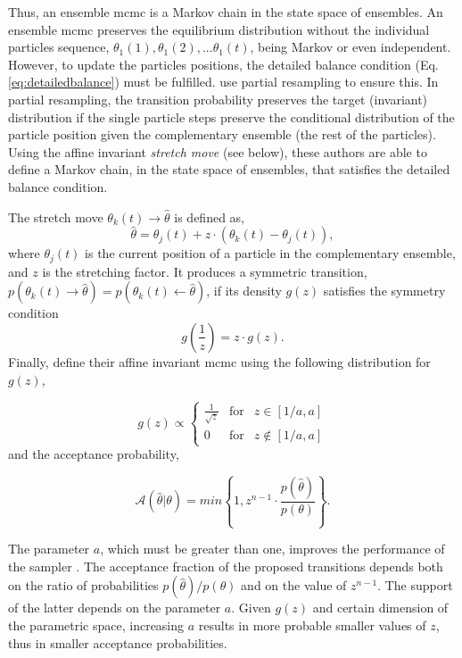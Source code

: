 Thus, an ensemble \gls{mcmc} is a Markov chain in the state space of ensembles. An ensemble \gls{mcmc} preserves the equilibrium distribution without the individual particles sequence, $\theta_1(1),\theta_1(2),...\theta_1(t)$, being Markov or even independent. However, to update the particles positions, the detailed balance condition (Eq. \ref{eq:detailedbalance}) must be fulfilled. \citet{Goodman2010} use partial resampling to ensure this. In partial resampling, the transition probability preserves the target (invariant) distribution if the single particle steps preserve the conditional distribution of the particle position given the complementary ensemble (the rest of the particles). Using the affine invariant \emph{stretch move} (see below), these authors are able to define a Markov chain, in the state space of ensembles, that satisfies the detailed balance condition. 

The stretch move $\theta_k(t) \rightarrow \hat{\theta}$ is defined as,
\begin{equation}
\label{eq:stretchmove}
\hat{\theta}= \theta_j(t) + z\cdot(\theta_k(t)-\theta_j(t)),\nonumber 
\end{equation}
where $\theta_j(t)$ is the current position of a particle in the complementary ensemble, and $z$ is the stretching factor. It produces a symmetric transition, $p(\theta_k(t) \rightarrow \hat{\theta})=p(\theta_k(t) \leftarrow \hat{\theta})$, if its density $g(z)$ satisfies the symmetry condition
\begin{equation}
g(\frac{1}{z})= z\cdot g(z).\nonumber 
\end{equation}
Finally, \citet{Goodman2010} define their affine invariant \gls{mcmc} using the following distribution for $g(z)$,

\begin{equation}
g(z) \propto \left\{ \begin{array}{rcl}
         \frac{1}{\sqrt{z}} & \mbox{for}&  z\in[1/a,a] \\ 
         0  & \mbox{for} &  z\notin[1/a,a]
                \end{array}\right.
\label{eq:gz}
\end{equation} 
and the acceptance probability,

\begin{equation}
\mathcal{A}(\hat{\theta}|\theta)=min\left\{1,z^{n-1}\cdot \frac{p(\hat{\theta})}{p(\theta)}\right\}.
\end{equation} 

{The parameter $a$, which must be greater than one, improves the performance of the sampler \citep{Goodman2010}. The acceptance fraction of the proposed transitions depends both on the ratio of probabilities $p(\hat{\theta})/p(\theta)$ and on the value of $z^{n-1}$. The support of the latter depends on the parameter $a$. Given $g(z)$ and certain dimension of the parametric space, increasing $a$ results in more probable smaller values of $z$, thus in smaller acceptance probabilities.}

